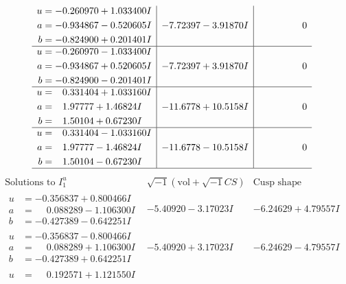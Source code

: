 \documentclass[1p]{elsarticle_modified}
\theoremstyle{definition}
\newcommand{\I}{\sqrt{-1}}
\begin{document}
$$\begin{array}{c|c|c}
\begin{aligned}
u &= -0.260970 + 1.033400 I \\
a &= -0.934867 - 0.520605 I \\
b &= -0.824900 + 0.201401 I\end{aligned}
 & -7.72397 - 3.91870 I & \phantom{-0.000000 } 0 \\ \hline\begin{aligned}
u &= -0.260970 - 1.033400 I \\
a &= -0.934867 + 0.520605 I \\
b &= -0.824900 - 0.201401 I\end{aligned}
 & -7.72397 + 3.91870 I & \phantom{-0.000000 } 0 \\ \hline\begin{aligned}
u &= \phantom{-}0.331404 + 1.033160 I \\
a &= \phantom{-}1.97777 + 1.46824 I \\
b &= \phantom{-}1.50104 + 0.67230 I\end{aligned}
 & -11.6778 + 10.5158 I & \phantom{-0.000000 } 0 \\ \hline\begin{aligned}
u &= \phantom{-}0.331404 - 1.033160 I \\
a &= \phantom{-}1.97777 - 1.46824 I \\
b &= \phantom{-}1.50104 - 0.67230 I\end{aligned}
 & -11.6778 - 10.5158 I & \phantom{-0.000000 } 0\\
 \hline 
 \end{array}$$\newpage$$\begin{array}{c|c|c}  
\text{Solutions to }I^u_{1}& \I (\text{vol} + \sqrt{-1}CS) & \text{Cusp shape}\\
 \hline 
\begin{aligned}
u &= -0.356837 + 0.800466 I \\
a &= \phantom{-}0.088289 - 1.106300 I \\
b &= -0.427389 - 0.642251 I\end{aligned}
 & -5.40920 - 3.17023 I & -6.24629 + 4.79557 I \\ \hline\begin{aligned}
u &= -0.356837 - 0.800466 I \\
a &= \phantom{-}0.088289 + 1.106300 I \\
b &= -0.427389 + 0.642251 I\end{aligned}
 & -5.40920 + 3.17023 I & -6.24629 - 4.79557 I \\ \hline\begin{aligned}
u &= \phantom{-}0.192571 + 1.121550 I \\

\end{aligned}
\end{array}$$
\end{document}
